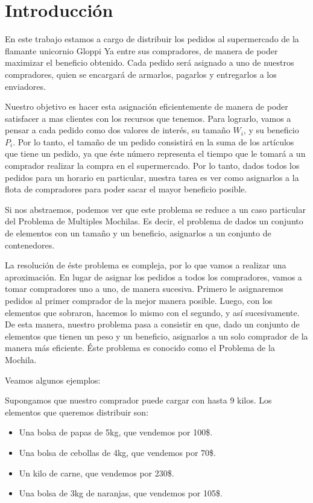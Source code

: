 \section{Introducción}
En este trabajo estamos a cargo de distribuir los pedidos al supermercado de la flamante unicornio Gloppi Ya entre sus compradores, de manera de poder maximizar el beneficio obtenido. Cada pedido será asignado a uno de nuestros compradores, quien se encargará de armarlos, pagarlos y entregarlos a los enviadores.


Nuestro objetivo es hacer esta asignación eficientemente de manera de poder satisfacer a mas clientes con los recursos que tenemos. Para lograrlo, vamos a pensar a cada pedido como dos valores de interés, su tamaño $W_{i}$, y su beneficio $P_{i}$. Por lo tanto, el tamaño de un pedido consistirá en la suma de los artículos que tiene un pedido, ya que éste número representa el tiempo que le tomará a un comprador realizar la compra en el supermercado.
Por lo tanto, dados todos los pedidos para un horario en particular, nuestra tarea es ver como asignarlos a la flota de compradores para poder sacar el mayor beneficio posible.


Si nos abstraemos, podemos ver que este problema se reduce a un caso particular del Problema de Multiples Mochilas. Es decir, el problema de dados un conjunto de elementos con un tamaño y un beneficio, asignarlos a un conjunto de contenedores.


La resolución de éste problema es compleja, por lo que vamos a realizar una aproximación. En lugar de asignar los pedidos a todos los compradores, vamos a tomar compradores uno a uno, de manera sucesiva. Primero le asignaremos pedidos al primer comprador de la mejor manera posible. Luego, con los elementos que sobraron, hacemos lo mismo con el segundo, y así sucesivamente.
De esta manera, nuestro problema pasa a consistir en que, dado un conjunto de elementos que tienen un peso y un beneficio, asignarlos a un solo comprador de la manera más eficiente. Éste problema es conocido como el Problema de la Mochila.


Veamos algunos ejemplos:

Supongamos que nuestro comprador puede cargar con hasta 9 kilos. Los elementos que queremos distribuir son:
\begin{itemize}
\item Una bolsa de papas de 5kg, que vendemos por 100\$.
\item Una bolsa de cebollas de 4kg, que vendemos por 70\$.
\item Un kilo de carne, que vendemos por 230\$.
\item Una bolsa de 3kg de naranjas, que vendemos por 105\$.
\end{itemize}

